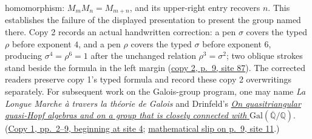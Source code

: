 \documentclass[11pt,a4paper]{article}
\begin{document}
homomorphism: $M_mM_n=M_{m+n}$, and its upper-right entry recovers $n$.
This establishes the
failure of the displayed presentation to present the group named there.
Copy 2 records an actual handwritten correction: a pen $\sigma$ covers
the typed $\rho$ before exponent $4$, and a pen $\rho$ covers the typed
$\sigma$ before exponent $6$, producing $\sigma^4=\rho^6=1$ after the
unchanged relation $\rho^3=\sigma^2$; two oblique strokes stand beside
the formula in the left margin
(\href{https://grothendieck.umontpellier.fr/web/viewer.html?file=../119.pdf\#page=88}{copy 2, p.~9, site 87}).
The corrected readers preserve copy 1's typed formula and record these
copy 2 overwritings separately. For subsequent work on the
Galois-group program, one may name \emph{La Longue Marche à travers la
théorie de Galois} and Drinfeld's
\href{https://www.mathnet.ru/eng/aa199}{\emph{On quasitriangular quasi-Hopf algebras and on a group that is closely connected with}
$\mathrm{Gal}(\overline{\mathbb Q}/\mathbb Q)$}.
(\href{https://grothendieck.umontpellier.fr/web/viewer.html?file=../119.pdf\#page=5}{Copy 1, pp.~2--9, beginning at site 4};
\href{https://grothendieck.umontpellier.fr/web/viewer.html?file=../119.pdf\#page=12}{mathematical slip on p.~9, site 11}.)
\end{document}
